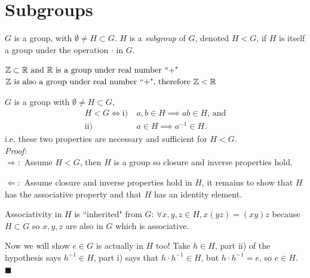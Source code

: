 \section{Subgroups}
\begin{definition}[Subgroups]
$G$ is a group, with $\emptyset \neq H \subset G$. $H$ is a \textit{subgroup} of $G$, denoted
$H < G$, if $H$ is itself a group under the operation $\cdot$ in $G$.
\end{definition}

\begin{example}
${\mathbb{Z}}\subset {\mathbb{R}} \text{ and }{\mathbb{R}}\text{ is a group under real number ``+"}$\\
${\mathbb{Z}} \text{ is also a group under real number ``+", therefore } {\mathbb{Z}} < {\mathbb{R}}$
\end{example}
\begin{lemma}[(Used in HW\# 3)]
$G$ is a group with $\emptyset\neq H\subset G$, \\
\begin{align}
    H<G \iff \text{i)}& \ a,b\in H \implies ab\in H \nonumber\text{, and}\\
             \text{ii)}& \ a\in H \implies a^{-1}\in H. \nonumber
\end{align}
i.e. these two properties are necessary and sufficient for $H<G$.\\
\textit{Proof:} \\
\noindent $\Rightarrow:$ Assume $H<G$, then $H$ is a group so closure and inverse properties
hold.\steezybreak

\noindent $\Leftarrow:$ Assume closure and inverse properties hold in $H$, it remains to show that
$H$ has the associative property and that $H$ has an identity element.\steezybreak

\noindent Associativity in $H$ is ``inherited" from $G$: $\forall x,y,z \in H, x(yz)=(xy)z$ because
$H\subset G$ so $x,y,z$ are also in $G$ which is associative.\steezybreak

\noindent Now we will show $e\in G$ is actually in $H$ too! Take $h\in H$, part ii) of the
hypothesis says $h^{-1}\in H$, part i) says that $h\cdot h^{-1}\in H$, but $h\cdot h^{-1}=e$, so
$e\in H$. $\blacksquare$
\end{lemma}

